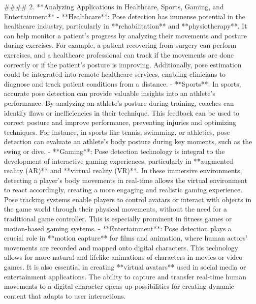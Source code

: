 \documentclass[a4paper,12pt]{report}
\begin{document}
#### 2. **Analyzing Applications in Healthcare, Sports, Gaming, and Entertainment**
   - **Healthcare**: Pose detection has immense potential in the healthcare industry, particularly in **rehabilitation** and **physiotherapy**. It can help monitor a patient’s progress by analyzing their movements and posture during exercises. For example, a patient recovering from surgery can perform exercises, and a healthcare professional can track if the movements are done correctly or if the patient’s posture is improving. Additionally, pose estimation could be integrated into remote healthcare services, enabling clinicians to diagnose and track patient conditions from a distance.
   - **Sports**: In sports, accurate pose detection can provide valuable insights into an athlete's performance. By analyzing an athlete's posture during training, coaches can identify flaws or inefficiencies in their technique. This feedback can be used to correct posture and improve performance, preventing injuries and optimizing techniques. For instance, in sports like tennis, swimming, or athletics, pose detection can evaluate an athlete's body posture during key moments, such as the swing or dive.
   - **Gaming**: Pose detection technology is integral to the development of interactive gaming experiences, particularly in **augmented reality (AR)** and **virtual reality (VR)**. In these immersive environments, detecting a player’s body movements in real-time allows the virtual environment to react accordingly, creating a more engaging and realistic gaming experience. Pose tracking systems enable players to control avatars or interact with objects in the game world through their physical movements, without the need for a traditional game controller. This is especially prominent in fitness games or motion-based gaming systems.
   - **Entertainment**: Pose detection plays a crucial role in **motion capture** for films and animation, where human actors’ movements are recorded and mapped onto digital characters. This technology allows for more natural and lifelike animations of characters in movies or video games. It is also essential in creating **virtual avatars** used in social media or entertainment applications. The ability to capture and transfer real-time human movements to a digital character opens up possibilities for creating dynamic content that adapts to user interactions.
\end{document}
